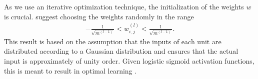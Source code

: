 As we use an iterative optimization technique, the initialization of the weights $w$ is crucial. \cite[p.~311-312]{DudaHartStork:2001} suggest choosing the weights randomly in the range
\begin{align}
	\label{eq:weight-initialization}
	- \frac{1}{\sqrt{m^{(l-1)}}} < w_{i,j}^{(l)} < \frac{1}{\sqrt{m^{(l-1)}}}.
\end{align}
This result is based on the assumption that the inputs of each unit are distributed according to a Gaussian distribution and ensures that the actual input is approximately of unity order. Given logistic sigmoid activation functions, this is meant to result in optimal learning \cite[p.~311-312]{DudaHartStork:2001}.

